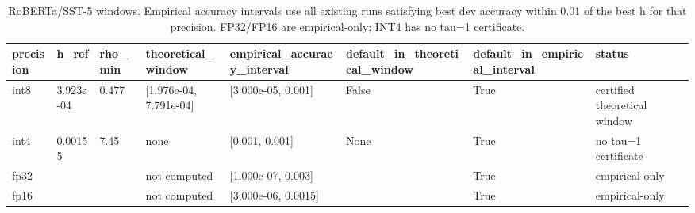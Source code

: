 \begin{table}[t]
\centering
\small
\begin{tabular}{llllllll}
\toprule
precision & h\_ref & rho\_min & theoretical\_window & empirical\_accuracy\_interval & default\_in\_theoretical\_window & default\_in\_empirical\_interval & status \\
\midrule
int8 & 3.923e-04 & 0.477 & [1.976e-04, 7.791e-04] & [3.000e-05, 0.001] & False & True & certified theoretical window \\
int4 & 0.00155 & 7.45 & none & [0.001, 0.001] & None & True & no tau=1 certificate \\
fp32 &  &  & not computed & [1.000e-07, 0.003] &  & True & empirical-only \\
fp16 &  &  & not computed & [3.000e-06, 0.0015] &  & True & empirical-only \\
\bottomrule
\end{tabular}
\caption{RoBERTa/SST-5 windows. Empirical accuracy intervals use all existing runs satisfying best dev accuracy within 0.01 of the best h for that precision. FP32/FP16 are empirical-only; INT4 has no tau=1 certificate.}
\label{tab:precision_window}
\end{table}
